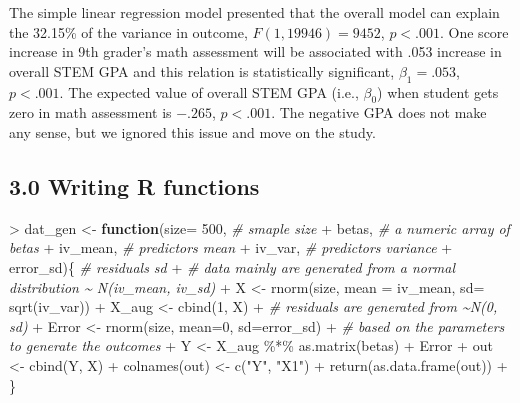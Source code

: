 \documentclass[
]{article}
\newenvironment{Shaded}{\begin{snugshade}}{\end{snugshade}}
\newcommand{\AttributeTok}[1]{\textcolor[rgb]{0.77,0.63,0.00}{#1}}
\newcommand{\CommentTok}[1]{\textcolor[rgb]{0.56,0.35,0.01}{\textit{#1}}}
\newcommand{\ControlFlowTok}[1]{\textcolor[rgb]{0.13,0.29,0.53}{\textbf{#1}}}
\newcommand{\DecValTok}[1]{\textcolor[rgb]{0.00,0.00,0.81}{#1}}
\newcommand{\FunctionTok}[1]{\textcolor[rgb]{0.00,0.00,0.00}{#1}}
\newcommand{\NormalTok}[1]{#1}
\newcommand{\OtherTok}[1]{\textcolor[rgb]{0.56,0.35,0.01}{#1}}
\newcommand{\SpecialCharTok}[1]{\textcolor[rgb]{0.00,0.00,0.00}{#1}}
\newcommand{\StringTok}[1]{\textcolor[rgb]{0.31,0.60,0.02}{#1}}
\begin{document}
The simple linear regression model presented that the overall model can
explain the 32.15\% of the variance in outcome, \(F(1,19946)=9452\),
\(p < .001\). One score increase in 9th grader's math assessment will be
associated with .053 increase in overall STEM GPA and this relation is
statistically significant, \(\beta_1=.053\), \(p <.001\). The expected
value of overall STEM GPA (i.e., \(\beta_0\)) when student gets zero in
math assessment is \(-.265\), \(p <.001\). The negative GPA does not
make any sense, but we ignored this issue and move on the study.

\hypertarget{writing-r-functions}{%
\subsection{3.0 Writing R functions}\label{writing-r-functions}}

\begin{Shaded}
\begin{Highlighting}[]
\SpecialCharTok{\textgreater{}}\NormalTok{ dat\_gen }\OtherTok{\textless{}{-}} \ControlFlowTok{function}\NormalTok{(}\AttributeTok{size=} \DecValTok{500}\NormalTok{,  }\CommentTok{\# smaple size}
\SpecialCharTok{+}\NormalTok{                     betas,      }\CommentTok{\# a numeric array of betas}
\SpecialCharTok{+}\NormalTok{                     iv\_mean,    }\CommentTok{\# predictor\textquotesingle{}s mean}
\SpecialCharTok{+}\NormalTok{                     iv\_var,     }\CommentTok{\# predictor\textquotesingle{}s variance}
\SpecialCharTok{+}\NormalTok{                     error\_sd)\{  }\CommentTok{\# residuals\textquotesingle{} sd}
\SpecialCharTok{+}   \CommentTok{\# data mainly are generated from a normal distribution \textasciitilde{} N(iv\_mean, iv\_sd)}
\SpecialCharTok{+}\NormalTok{   X }\OtherTok{\textless{}{-}} \FunctionTok{rnorm}\NormalTok{(size, }\AttributeTok{mean =}\NormalTok{ iv\_mean, }\AttributeTok{sd=} \FunctionTok{sqrt}\NormalTok{(iv\_var))}
\SpecialCharTok{+}\NormalTok{   X\_aug }\OtherTok{\textless{}{-}} \FunctionTok{cbind}\NormalTok{(}\DecValTok{1}\NormalTok{, X)}
\SpecialCharTok{+}   \CommentTok{\# residuals are generated from \textasciitilde{}N(0, sd)}
\SpecialCharTok{+}\NormalTok{   Error }\OtherTok{\textless{}{-}} \FunctionTok{rnorm}\NormalTok{(size, }\AttributeTok{mean=}\DecValTok{0}\NormalTok{, }\AttributeTok{sd=}\NormalTok{error\_sd)}
\SpecialCharTok{+}   \CommentTok{\# based on the parameters to generate the outcomes}
\SpecialCharTok{+}\NormalTok{   Y }\OtherTok{\textless{}{-}}\NormalTok{ X\_aug }\SpecialCharTok{\%*\%} \FunctionTok{as.matrix}\NormalTok{(betas) }\SpecialCharTok{+}\NormalTok{ Error}
\SpecialCharTok{+}\NormalTok{   out }\OtherTok{\textless{}{-}} \FunctionTok{cbind}\NormalTok{(Y, X)}
\SpecialCharTok{+}   \FunctionTok{colnames}\NormalTok{(out) }\OtherTok{\textless{}{-}} \FunctionTok{c}\NormalTok{(}\StringTok{"Y"}\NormalTok{, }\StringTok{"X1"}\NormalTok{)}
\SpecialCharTok{+}   \FunctionTok{return}\NormalTok{(}\FunctionTok{as.data.frame}\NormalTok{(out))}
\SpecialCharTok{+}\NormalTok{ \}}
\end{Highlighting}
\end{Shaded}
\end{document}
